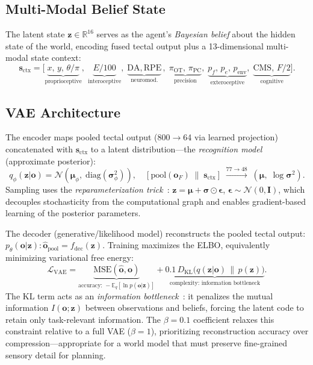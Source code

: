 \documentclass[11pt,a4paper]{article}
\begin{document}
\subsection{Multi-Modal Belief State}

The latent state $\mathbf{z} \in \mathbb{R}^{16}$ serves as the agent's
\emph{Bayesian belief} about the hidden state of the world, encoding fused
tectal output plus a 13-dimensional multi-modal state context:
\begin{equation}\label{eq:state_ctx}
\mathbf{s}_\text{ctx} = \bigl[
  \underbrace{x,\, y,\, \theta/\pi}_\text{proprioceptive},\;
  \underbrace{E/100}_\text{interoceptive},\;
  \underbrace{\text{DA},\, \text{RPE}}_\text{neuromod.},\;
  \underbrace{\pi_\text{OT},\, \pi_\text{PC}}_\text{precision},\;
  \underbrace{p_f,\, p_e,\, p_\text{env}}_\text{exteroceptive},\;
  \underbrace{\text{CMS},\, F/2}_\text{cognitive}
\bigr].
\end{equation}

\subsection{VAE Architecture}

The encoder maps pooled tectal output (800$\to$64 via learned projection)
concatenated with $\mathbf{s}_\text{ctx}$ to a latent distribution---the
\emph{recognition model} (approximate posterior):
\begin{equation}\label{eq:vae_enc}
  q_\phi(\mathbf{z}|\mathbf{o}) = \mathcal{N}(\boldsymbol{\mu}_\phi,\;
    \text{diag}(\boldsymbol{\sigma}_\phi^2)),
  \quad
  [\text{pool}(\mathbf{o}_F)\;\|\;\mathbf{s}_\text{ctx}]
  \;\xrightarrow{77 \to 48}\;
  (\boldsymbol{\mu},\; \log\boldsymbol{\sigma}^2).
\end{equation}
Sampling uses the \emph{reparameterization trick}~\cite{kingma2014}:
$\mathbf{z} = \boldsymbol{\mu} + \boldsymbol{\sigma}\odot\boldsymbol{\epsilon}$,
$\boldsymbol{\epsilon} \sim \mathcal{N}(0, \mathbf{I})$,
which decouples stochasticity from the computational graph and enables
gradient-based learning of the posterior parameters.

The decoder (generative/likelihood model) reconstructs the pooled tectal output:
$p_\theta(\mathbf{o}|\mathbf{z}): \hat{\mathbf{o}}_\text{pool} = f_\text{dec}(\mathbf{z})$.
Training maximizes the ELBO, equivalently minimizing variational free energy:
\begin{equation}\label{eq:elbo}
  \mathcal{L}_\text{VAE} =
    \underbrace{\text{MSE}(\hat{\mathbf{o}}, \mathbf{o})}_{\text{accuracy: } -\mathbb{E}_q[\ln p(\mathbf{o}|\mathbf{z})]}
    + \underbrace{0.1\,D_\text{KL}\!\bigl(q(\mathbf{z}|\mathbf{o})\,\|\,p(\mathbf{z})\bigr)}_{\text{complexity: information bottleneck}}.
\end{equation}
The KL term acts as an \emph{information bottleneck}~\cite{tishby2000}:
it penalizes the mutual information $I(\mathbf{o}; \mathbf{z})$ between
observations and beliefs, forcing the latent code to retain only
task-relevant information.
The $\beta = 0.1$ coefficient relaxes this constraint relative to a
full VAE ($\beta=1$), prioritizing reconstruction accuracy over
compression---appropriate for a world model that must preserve
fine-grained sensory detail for planning.
\end{document}
